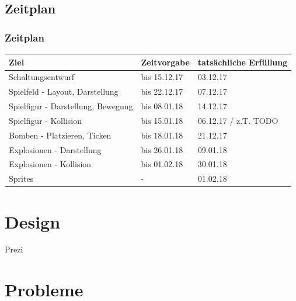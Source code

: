 \documentclass[18pt]{beamer}
\begin{document}
	\subsection{Zeitplan}
		\begin{frame}
			\frametitle{Zeitplan}
			\begin{table}[H]
				\centering
				\label{my-label}
				\begin{tabular}{l|l|l}
					Ziel                                      & Zeitvorgabe  & tatsächliche Erfüllung\\
					\hline
					Schaltungsentwurf                         & bis 15.12.17 & 03.12.17\\
					Spielfeld - Layout, Darstellung           & bis 22.12.17 & 07.12.17\\
					Spielfigur - Darstellung, Bewegung        & bis 08.01.18 & 14.12.17\\
					Spielfigur - Kollision                    & bis 15.01.18 & 06.12.17 / z.T. TODO\\
					Bomben - Platzieren, Ticken               & bis 18.01.18 & 21.12.17\\
					Explosionen - Darstellung                 & bis 26.01.18 & 09.01.18\\
					Explosionen - Kollision                   & bis 01.02.18 & 30.01.18\\
					Sprites                                   & - & 01.02.18\\
				\end{tabular}
			\end{table}
		\end{frame}
	
\section{Design}
	\begin{frame}
		\centering \huge Prezi
	\end{frame}
	
\section{Probleme}
\end{document}
